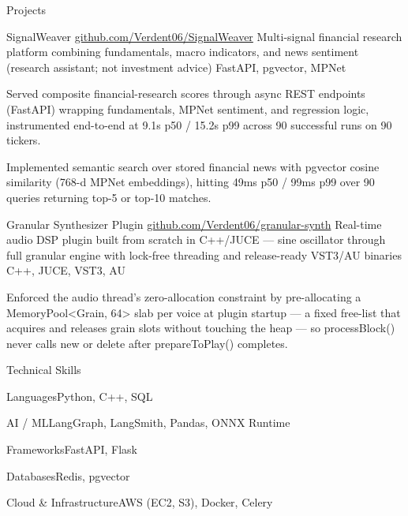 \documentclass[
	11pt
]{../../../template}
\begin{document}
	\begin{rSection}{P}{rojects}
		\begin{rSectionEntry}
			{SignalWeaver}
			{\href{https://github.com/Verdent06/SignalWeaver}{github.com/Verdent06/SignalWeaver}}
			{Multi-signal financial research platform combining fundamentals, macro indicators, and news sentiment (research assistant; not investment advice)}
			{FastAPI, pgvector, MPNet}
			{}

			\item Served composite financial-research scores through async REST endpoints (FastAPI) wrapping fundamentals, MPNet sentiment, and regression logic, instrumented end-to-end at 9.1s p50 / 15.2s p99 across 90 successful runs on 90 tickers.
			\item Implemented semantic search over stored financial news with pgvector cosine similarity (768-d MPNet embeddings), hitting 49ms p50 / 99ms p99 over 90 queries returning top-5 or top-10 matches.
		\end{rSectionEntry}

		\begin{rSectionEntry}
			{Granular Synthesizer Plugin}
			{\href{https://github.com/Verdent06/granular-synth}{github.com/Verdent06/granular-synth}}
			{Real-time audio DSP plugin built from scratch in C++/JUCE --- sine oscillator through full granular engine with lock-free threading and release-ready VST3/AU binaries}
			{C++, JUCE, VST3, AU}
			{}

			\item Enforced the audio thread's zero-allocation constraint by pre-allocating a MemoryPool\textless{}Grain, 64\textgreater{} slab per voice at plugin startup --- a fixed free-list that acquires and releases grain slots without touching the heap --- so processBlock() never calls new or delete after prepareToPlay() completes.
		\end{rSectionEntry}
	\end{rSection}

	\begin{rSection}{T}{echnical Skills}
		\begin{rSet}{Languages}{Python, C++, SQL}
		\end{rSet}
		\begin{rSet}{AI / ML}{LangGraph, LangSmith, Pandas, ONNX Runtime}
		\end{rSet}
		\begin{rSet}{Frameworks}{FastAPI, Flask}
		\end{rSet}
		\begin{rSet}{Databases}{Redis, pgvector}
		\end{rSet}
		\begin{rSet}{Cloud \& Infrastructure}{AWS (EC2, S3), Docker, Celery}
		\end{rSet}
	\end{rSection}
\end{document}

